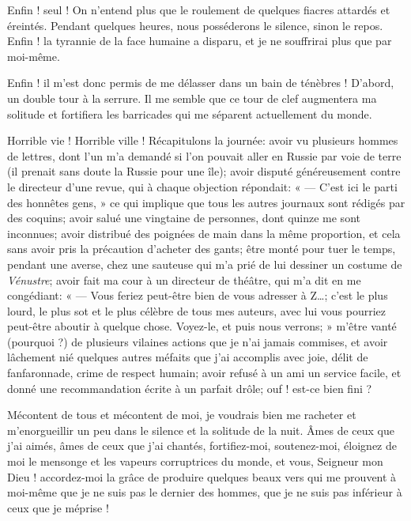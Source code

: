 
Enfin ! seul ! On n’entend plus que le roulement de
quelques fiacres attardés et éreintés. Pendant quelques heures, nous
posséderons le silence, sinon le repos. Enfin ! la tyrannie de la face
humaine a disparu, et je ne souffrirai plus que par moi{}-même.

Enfin ! il m’est donc permis de me délasser dans un
bain de ténèbres ! D’abord, un double tour à la
serrure. Il me semble que ce tour de clef augmentera ma solitude et
fortifiera les barricades qui me séparent actuellement du monde.

Horrible vie ! Horrible ville ! Récapitulons la journée: avoir vu
plusieurs hommes de lettres, dont l’un
m’a demandé si l’on pouvait aller en
Russie par voie de terre (il prenait sans doute la Russie pour une
île); avoir disputé généreusement contre le directeur
d’une revue, qui à chaque objection répondait: « ---
C’est ici le parti des honnêtes gens, » ce qui
implique que tous les autres journaux sont rédigés par des coquins;
avoir salué une vingtaine de personnes, dont quinze me sont inconnues;
avoir distribué des poignées de main dans la même proportion, et cela
sans avoir pris la précaution d’acheter des gants;
être monté pour tuer le temps, pendant une averse, chez une sauteuse
qui m’a prié de lui dessiner un costume de \textit{Vénustre};
avoir fait ma cour à un directeur de théâtre, qui m’a
dit en me congédiant: « --- Vous feriez peut{}-être bien de vous adresser
à Z\ldots; c’est le plus lourd, le plus sot et le plus
célèbre de tous mes auteurs, avec lui vous pourriez peut{}-être aboutir
à quelque chose. Voyez{}-le, et puis nous verrons; »
m’être vanté (pourquoi ?) de plusieurs vilaines
actions que je n’ai jamais commises, et avoir
lâchement nié quelques autres méfaits que j’ai
accomplis avec joie, délit de fanfaronnade, crime de respect humain;
avoir refusé à un ami un service facile, et donné une recommandation
écrite à un parfait drôle; ouf ! est{}-ce bien fini ?

Mécontent de tous et mécontent de moi, je voudrais bien me racheter et
m’enorgueillir un peu dans le silence et la solitude
de la nuit. Âmes de ceux que j’ai aimés, âmes de ceux
que j’ai chantés, fortifiez{}-moi, soutenez{}-moi,
éloignez de moi le mensonge et les vapeurs corruptrices du monde, et
vous, Seigneur mon Dieu ! accordez{}-moi la grâce de produire quelques
beaux vers qui me prouvent à moi{}-même que je ne suis pas le dernier
des hommes, que je ne suis pas inférieur à ceux que je méprise !

